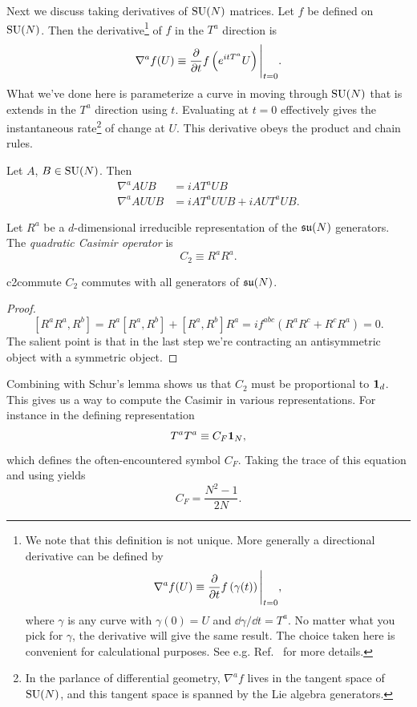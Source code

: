Next we discuss taking derivatives of $\operatorname{SU}(N)$ matrices.
Let $f$ be defined on $\operatorname{SU}(N)$. Then the 
derivative\footnote{We note that this definition is not unique.
More generally a directional derivative can be defined by
$$
\nabla^af(U)\equiv\pdv{}{t}f\left(\gamma(t)\right)\Bigg|_{t=0},
$$
where $\gamma$ is any curve with $\gamma(0)=U$ and
$\dd\gamma/\dd t=T^a$. No matter what you pick for $\gamma$,
the derivative will give the same result. The choice taken here
is convenient for calculational purposes.
See e.g. Ref.~\cite{hall_lie_2003} for more details.
}
of $f$ in the $T^a$ direction is
\begin{equation}\label{eq:lieDeriv}
\nabla^af(U)\equiv\pdv{}{t}f\left(e^{itT^a}U\right)\Bigg|_{t=0}.
\end{equation}
What we've done here is parameterize a curve in moving through $\operatorname{SU}(N)$ that is
extends in the $T^a$ direction using $t$. Evaluating at $t=0$
effectively gives the instantaneous rate\footnote{In the parlance
of differential geometry, $\nabla^a f$ lives in the tangent space
of $\operatorname{SU}(N)$, and this tangent space is spanned by the Lie algebra generators.} 
of change at $U$. This derivative obeys the product and chain rules.

\begin{example*}{}{}
Let $A$, $B\in\operatorname{SU}(N)$. Then
\begin{equation*}\begin{aligned}
\nabla^a AUB&=iAT^aUB\\
\nabla^a AUUB&=iAT^aUUB + iAUT^aUB.
\end{aligned}\end{equation*}
\end{example*}

Let $R^a$ be a $d$-dimensional irreducible representation of the
$\operatorname{\mathfrak{su}}(N)$ generators. The {\it quadratic Casimir operator}
is
\begin{equation}
C_2\equiv R^a R^a.
\end{equation}

\begin{proposition}{}{c2commute}
$C_2$ commutes with all generators of $\operatorname{\mathfrak{su}}(N)$.
\begin{proof}
$$
\left[R^a R^a, R^b\right]=R^a\left[R^a, R^b\right]+\left[R^a, R^b\right] R^a=i
f^{a b c}\left(R^a R^c+R^c R^a\right)=0.
$$
The salient point is that in the last step we're contracting an antisymmetric
object with a symmetric object.
\end{proof}
\end{proposition}
Combining  with Schur's lemma shows us that
$C_2$ must be proportional to ${\mathbf 1}_d$. This gives us a way
to compute the Casimir in various representations. For
instance in the defining representation
\begin{equation}
T^aT^a\equiv C_F{\mathbf 1}_N,
\end{equation}
which defines the often-encountered symbol $C_F$.
Taking the trace of this equation and using
 yields
\begin{equation}
C_F=\frac{N^2-1}{2N}.
\end{equation}


